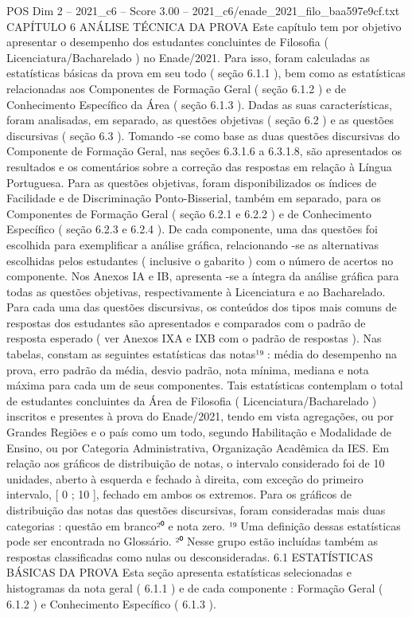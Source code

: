 \begin{textsample}{POS Dim 2 – 2021\_c6 – Score 3.00 – 2021\_c6/enade\_2021\_filo\_baa597e9cf.txt}  \label{ex:f2_pos_176}
CAPÍTULO 6 ANÁLISE TÉCNICA DA PROVA Este capítulo tem por objetivo apresentar o desempenho dos estudantes concluintes de Filosofia ( Licenciatura/Bacharelado ) no Enade/2021.
Para isso, foram calculadas as estatísticas básicas da prova em seu todo ( seção 6.1.1 ), bem como as estatísticas relacionadas aos Componentes de Formação Geral ( seção 6.1.2 ) e de Conhecimento Específico da Área ( seção 6.1.3 ).
Dadas as suas características, foram analisadas, em separado, as questões objetivas ( seção 6.2 ) e as questões discursivas ( seção 6.3 ).
Tomando -se como base as duas questões discursivas do Componente de Formação Geral, nas seções 6.3.1.6 a 6.3.1.8, são apresentados os resultados e os comentários sobre a correção das respostas em relação à Língua Portuguesa.
Para as questões objetivas, foram disponibilizados os índices de Facilidade e de Discriminação Ponto-Bisserial, também em separado, para os Componentes de Formação Geral ( seção 6.2.1 e 6.2.2 ) e de Conhecimento Específico ( seção 6.2.3 e 6.2.4 ).
De cada componente, uma das questões foi escolhida para exemplificar a análise gráfica, relacionando -se as alternativas escolhidas pelos estudantes ( inclusive o gabarito ) com o número de acertos no componente.
Nos Anexos IA e IB, apresenta -se a íntegra da análise gráfica para todas as questões objetivas, respectivamente à Licenciatura e ao Bacharelado.
Para cada uma das questões discursivas, os conteúdos dos tipos mais comuns de respostas dos estudantes são apresentados e comparados com o padrão de resposta esperado ( ver Anexos IXA e IXB com o padrão de respostas ).
Nas tabelas, constam as seguintes estatísticas das notas¹⁹ : média do desempenho na prova, erro padrão da média, desvio padrão, nota mínima, mediana e nota máxima para cada um de seus componentes.
Tais estatísticas contemplam o total de estudantes concluintes da Área de Filosofia ( Licenciatura/Bacharelado ) inscritos e presentes à prova do Enade/2021, tendo em vista agregações, ou por Grandes Regiões e o país como um todo, segundo Habilitação e Modalidade de Ensino, ou por Categoria Administrativa, Organização Acadêmica da IES.
Em relação aos gráficos de distribuição de notas, o intervalo considerado foi de 10 unidades, aberto à esquerda e fechado à direita, com exceção do primeiro intervalo, [ 0 ; 10 ], fechado em ambos os extremos.
Para os gráficos de distribuição das notas das questões discursivas, foram consideradas mais duas categorias : questão em branco²⁰ e nota zero. ¹⁹ Uma definição dessas estatísticas pode ser encontrada no Glossário. ²⁰ Nesse grupo estão incluídas também as respostas classificadas como nulas ou desconsideradas. 6.1 ESTATÍSTICAS BÁSICAS DA PROVA Esta seção apresenta estatísticas selecionadas e histogramas da nota geral ( 6.1.1 ) e de cada componente : Formação Geral ( 6.1.2 ) e Conhecimento Específico ( 6.1.3 ).

\end{textsample}
